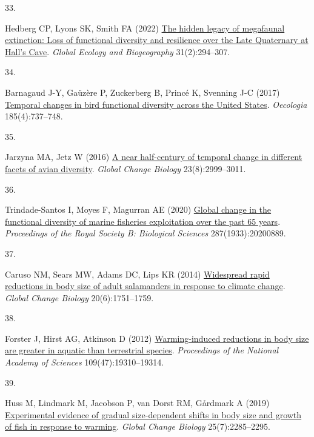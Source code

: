 \documentclass{article}
\newlength{\cslhangindent}
\newlength{\csllabelwidth}
\newlength{\cslentryspacingunit} %
\newenvironment{CSLReferences}[2] %
 {%
  \setlength{\parindent}{0pt}
  \ifodd #1
  \let\oldpar\par
  \def\par{\hangindent=\cslhangindent\oldpar}
  \fi
  \setlength{\parskip}{#2\cslentryspacingunit}
 }%
 {}
\newcommand{\CSLLeftMargin}[1]{\parbox[t]{\csllabelwidth}{#1}}
\newcommand{\CSLRightInline}[1]{\parbox[t]{\linewidth - \csllabelwidth}{#1}\break}
\begin{document}
\begin{CSLReferences}{0}{0}
\leavevmode{}%
\CSLLeftMargin{33. }%
\CSLRightInline{Hedberg CP, Lyons SK, Smith FA (2022)
\href{https://doi.org/10.1111/geb.13428}{The hidden legacy of megafaunal
extinction: Loss of functional diversity and resilience over the Late
Quaternary at Hall{'}s Cave}. \emph{Global Ecology and Biogeography}
31(2):294--307.}

\leavevmode{}%
\CSLLeftMargin{34. }%
\CSLRightInline{Barnagaud J-Y, Gaüzère P, Zuckerberg B, Princé K,
Svenning J-C (2017)
\href{https://doi.org/10.1007/s00442-017-3967-4}{Temporal changes in
bird functional diversity across the United States}. \emph{Oecologia}
185(4):737--748.}

\leavevmode{}%
\CSLLeftMargin{35. }%
\CSLRightInline{Jarzyna MA, Jetz W (2016)
\href{https://doi.org/10.1111/gcb.13571}{A near half-century of temporal
change in different facets of avian diversity}. \emph{Global Change
Biology} 23(8):2999--3011.}

\leavevmode{}%
\CSLLeftMargin{36. }%
\CSLRightInline{Trindade-Santos I, Moyes F, Magurran AE (2020)
\href{https://doi.org/10.1098/rspb.2020.0889}{Global change in the
functional diversity of marine fisheries exploitation over the past 65
years}. \emph{Proceedings of the Royal Society B: Biological Sciences}
287(1933):20200889.}

\leavevmode{}%
\CSLLeftMargin{37. }%
\CSLRightInline{Caruso NM, Sears MW, Adams DC, Lips KR (2014)
\href{https://doi.org/10.1111/gcb.12550}{Widespread rapid reductions in
body size of adult salamanders in response to climate change}.
\emph{Global Change Biology} 20(6):1751--1759.}

\leavevmode{}%
\CSLLeftMargin{38. }%
\CSLRightInline{Forster J, Hirst AG, Atkinson D (2012)
\href{https://doi.org/10.1073/pnas.1210460109}{Warming-induced
reductions in body size are greater in aquatic than terrestrial
species}. \emph{Proceedings of the National Academy of Sciences}
109(47):19310--19314.}

\leavevmode{}%
\CSLLeftMargin{39. }%
\CSLRightInline{Huss M, Lindmark M, Jacobson P, van Dorst RM, Gårdmark A
(2019) \href{https://doi.org/10.1111/gcb.14637}{Experimental evidence of
gradual size-dependent shifts in body size and growth of fish in
response to warming}. \emph{Global Change Biology} 25(7):2285--2295.}


\end{CSLReferences}
\end{document}
